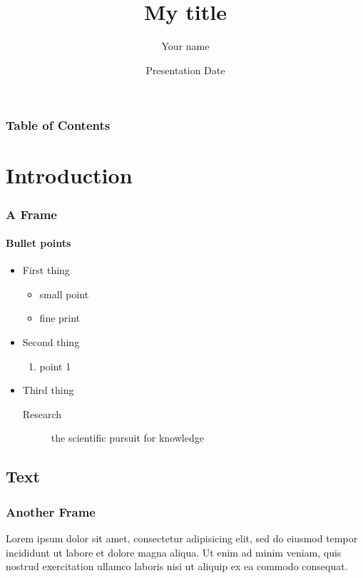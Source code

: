 \documentclass[]{beamer}
\title[Title]{My title}
\author{Your name}
\institute[Uni]{Your University} %
\date{Presentation Date}
\begin{document}
\begin{frame}
  \frametitle{\null}	%
  \maketitle
\end{frame}

\begin{frame}
\frametitle{Table of Contents}
\tableofcontents
\end{frame}


\section{Introduction}
\begin{frame}
\frametitle{A Frame}
\framesubtitle{Bullet points}
\begin{itemize}
\item First thing
	\begin{itemize}
	\item small point
	\item fine print
	\end{itemize}
\item Second thing
	\begin{enumerate}
	\item point 1
	\end{enumerate}
\item Third thing
	\begin{description}
	\item[Research] the scientific pursuit for knowledge
	\end{description}
\end{itemize}
\end{frame}

\subsection{Text}
\begin{frame}
\frametitle{Another Frame}
Lorem ipsum dolor sit amet, consectetur adipisicing elit, sed do eiusmod tempor incididunt ut labore et dolore magna aliqua. Ut enim ad minim veniam, quis nostrud exercitation ullamco laboris nisi ut aliquip ex ea commodo consequat.
\end{frame}
\end{document}
